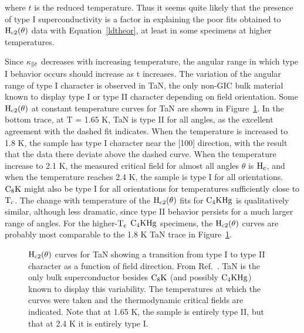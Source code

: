 \noindent where $t$ is the reduced temperature.  Thus it seems
quite likely that the presence of  type I superconductivity  is a factor in
explaining  the poor  fits obtained  to    $\rm  H_{c2}(\theta)$ data  with
Equation~\ref{ldtheor}, at least in some specimens at higher temperatures.

	Since  $\rm \kappa_{\parallel \hat{c}}$  decreases  with increasing
temperature, the  angular range in  which  type I  behavior   occurs should
increase as  t increases.   The variation of  the  angular range of  type I
character  is  observed in  TaN, the only  non-GIC  bulk material  known to
display  type   I   or   type    II      character depending    on    field
orientation.\cite{weber78}  Some  $\rm    H_{c2}(\theta)$    at    constant
temperature  curves for  TaN are shown  in Figure~\ref{TaN}.  In the bottom
trace, at T  = 1.65 K, TaN is  type II  for  all  angles, as  the excellent
agreement with the dashed fit indicates.  When the temperature is increased
to 1.8 K, the sample  has type I character near  the  [100] direction, with
the result  that the  data there deviate above  the dashed curve.  When the
temperature increase to 2.1  K, the measured critical  field for almost all
angles $\theta$ is $\rm H_{c}$, and when the temperature reaches 2.4 K, the
sample is type I for all orientations.  $\rm C_8K$ might also be type I for
all orientations for  temperatures sufficiently close  to $\rm T_c$.    The
change with temperature of the $\rm  H_{c2}(\theta)$  fits for $\rm C_4KHg$
is qualitatively similar,  although less  dramatic, since  type II behavior
persists for a much larger range of angles.  For the  higher-$\rm T_c$ $\rm
C_4KHg$ specimens,   the  $\rm H_{c2}(\theta)$  curves   are  probably most
comparable to the 1.8 K TaN trace in Figure~\ref{TaN}.


\begin{figure}
\vspace{18cm}
\caption[Type I and type II superconductivity in TaN.]{$\rm H_{c2}(\theta)$
curves for TaN showing  a transition from type I  to type II character as a
function of field direction.  From Ref.~\cite{weber78}.  TaN is the only  bulk  superconductor besides
$\rm C_8K$ (and possibly  $\rm C_4KHg$) known to  display this variability.
The  temperatures at  which  the curves were   taken  and the thermodynamic
critical fields are indicated.  Note that at 1.65 K, the sample is entirely
type II, but that at 2.4 K it is entirely type I.}
\label{TaN}
\end{figure}

